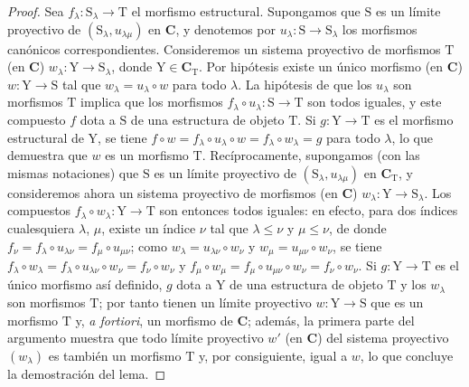 \begin{proof}
Sea $f_\lambda:\mathrm{S}_\lambda\to\mathrm{T}$ el morfismo estructural.
Supongamos que $\mathrm{S}$ es un límite proyectivo de $(\mathrm{S}_\lambda,u_{\lambda\mu})$ en $\mathbf{C}$, y denotemos por $u_\lambda:\mathrm{S}\to\mathrm{S}_\lambda$ los morfismos canónicos correspondientes.
Consideremos un sistema proyectivo de morfismos $\mathrm{T}$ (en $\mathbf{C}$) $w_\lambda:\mathrm{Y}\to\mathrm{S}_\lambda$, donde $\mathrm{Y}\in\mathbf{C}_\mathrm{T}$.
Por hipótesis existe un único morfismo (en $\mathbf{C}$) $w:\mathrm{Y}\to\mathrm{S}$ tal que $w_\lambda=u_\lambda\circ w$ para todo $\lambda$.
La hipótesis de que los $u_\lambda$ son morfismos $\mathrm{T}$ implica que los morfismos $f_\lambda\circ u_\lambda:\mathrm{S}\to\mathrm{T}$ son todos iguales, y este compuesto $f$ dota a $\mathrm{S}$ de una estructura de objeto $\mathrm{T}$.
Si $g:\mathrm{Y}\to\mathrm{T}$ es el morfismo estructural de $\mathrm{Y}$, se tiene $f\circ w=f_\lambda\circ u_\lambda\circ w=f_\lambda\circ w_\lambda=g$ para todo $\lambda$, lo que demuestra que $w$ es un morfismo $\mathrm{T}$.
Recíprocamente, supongamos (con las mismas notaciones) que $\mathrm{S}$ es un límite proyectivo de $(\mathrm{S}_\lambda,u_{\lambda\mu})$ en $\mathbf{C}_\mathrm{T}$, y consideremos ahora un sistema proyectivo de morfismos (en $\mathbf{C}$) $w_\lambda:\mathrm{Y}\to\mathrm{S}_\lambda$.
Los compuestos $f_\lambda\circ w_\lambda:\mathrm{Y}\to\mathrm{T}$ son entonces todos iguales: en efecto, para dos índices cualesquiera $\lambda$, $\mu$, existe un índice $\nu$ tal que $\lambda\leqslant\nu$ y $\mu\leqslant\nu$, de donde $f_\nu=f_\lambda\circ u_{\lambda\nu}=f_\mu\circ u_{\mu\nu}$; como $w_\lambda=u_{\lambda\nu}\circ w_\nu$ y $w_\mu=u_{\mu\nu}\circ w_\nu$, se tiene $f_\lambda\circ w_\lambda=f_\lambda\circ u_{\lambda\nu}\circ w_\nu=f_\nu\circ w_\nu$ y $f_\mu\circ w_\mu=f_\mu\circ u_{\mu\nu}\circ w_\nu=f_\nu\circ w_\nu$.
Si $g:\mathrm{Y}\to\mathrm{T}$ es el único morfismo así definido, $g$ dota a $\mathrm{Y}$ de una estructura de objeto $\mathrm{T}$ y los $w_\lambda$ son morfismos $\mathrm{T}$; por tanto tienen un límite proyectivo $w:\mathrm{Y}\to\mathrm{S}$ que es un morfismo $\mathrm{T}$ y, \emph{a fortiori}, un morfismo de $\mathbf{C}$; además, la primera parte del argumento muestra que todo límite proyectivo $w'$ (en $\mathbf{C}$) del sistema proyectivo $(w_\lambda)$ es también un morfismo $\mathrm{T}$ y, por consiguiente, igual a $w$, lo que concluye la demostración del lema.
\end{proof}

